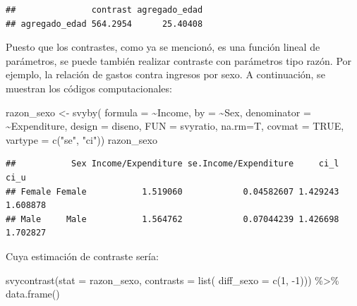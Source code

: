 \documentclass[
  12pt,
]{book}
\newenvironment{Shaded}{\begin{snugshade}}{\end{snugshade}}
\newcommand{\AttributeTok}[1]{\textcolor[rgb]{0.77,0.63,0.00}{#1}}
\newcommand{\ConstantTok}[1]{\textcolor[rgb]{0.00,0.00,0.00}{#1}}
\newcommand{\DecValTok}[1]{\textcolor[rgb]{0.00,0.00,0.81}{#1}}
\newcommand{\FunctionTok}[1]{\textcolor[rgb]{0.00,0.00,0.00}{#1}}
\newcommand{\NormalTok}[1]{#1}
\newcommand{\OtherTok}[1]{\textcolor[rgb]{0.56,0.35,0.01}{#1}}
\newcommand{\SpecialCharTok}[1]{\textcolor[rgb]{0.00,0.00,0.00}{#1}}
\newcommand{\StringTok}[1]{\textcolor[rgb]{0.31,0.60,0.02}{#1}}
\begin{document}
\begin{verbatim}
##               contrast agregado_edad
## agregado_edad 564.2954      25.40408
\end{verbatim}

Puesto que los contrastes, como ya se mencionó, es una función lineal de parámetros, se puede también realizar contraste con parámetros tipo razón. Por ejemplo, la relación de gastos contra ingresos por sexo. A continuación, se muestran los códigos computacionales:

\begin{Shaded}
\begin{Highlighting}[]
\NormalTok{razon\_sexo }\OtherTok{\textless{}{-}} \FunctionTok{svyby}\NormalTok{( }\AttributeTok{formula =} \SpecialCharTok{\textasciitilde{}}\NormalTok{Income, }
                     \AttributeTok{by =} \SpecialCharTok{\textasciitilde{}}\NormalTok{Sex,}
                     \AttributeTok{denominator =} \SpecialCharTok{\textasciitilde{}}\NormalTok{Expenditure,}
                     \AttributeTok{design =}\NormalTok{ diseno, }
                     \AttributeTok{FUN =}\NormalTok{ svyratio, }
                     \AttributeTok{na.rm=}\NormalTok{T, }\AttributeTok{covmat =} \ConstantTok{TRUE}\NormalTok{, }
                     \AttributeTok{vartype =} \FunctionTok{c}\NormalTok{(}\StringTok{"se"}\NormalTok{, }\StringTok{"ci"}\NormalTok{))}
\NormalTok{razon\_sexo}
\end{Highlighting}
\end{Shaded}

\begin{verbatim}
##           Sex Income/Expenditure se.Income/Expenditure     ci_l     ci_u
## Female Female           1.519060            0.04582607 1.429243 1.608878
## Male     Male           1.564762            0.07044239 1.426698 1.702827
\end{verbatim}

Cuya estimación de contraste sería:

\begin{Shaded}
\begin{Highlighting}[]
\FunctionTok{svycontrast}\NormalTok{(}\AttributeTok{stat =}\NormalTok{ razon\_sexo, }
            \AttributeTok{contrasts =} \FunctionTok{list}\NormalTok{(}
                             \AttributeTok{diff\_sexo =} \FunctionTok{c}\NormalTok{(}\DecValTok{1}\NormalTok{, }\SpecialCharTok{{-}}\DecValTok{1}\NormalTok{))) }\SpecialCharTok{\%\textgreater{}\%} \FunctionTok{data.frame}\NormalTok{()}
\end{Highlighting}
\end{Shaded}
\end{document}
